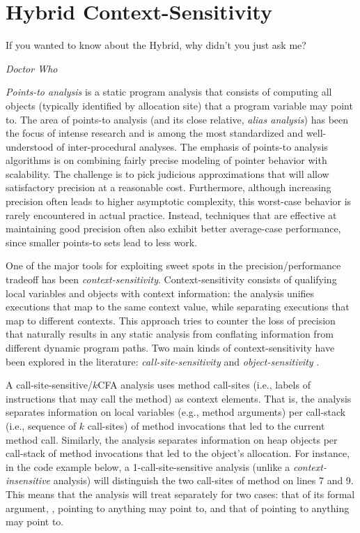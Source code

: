 \chapter{Hybrid Context-Sensitivity}\label{chapter:hybrid}

\epigraph{If you wanted to know about the Hybrid, why didn’t you just ask me?}{\textit{Doctor Who}}

\emph{Points-to analysis} is a static program analysis that consists
of computing all objects (typically identified by allocation site)
that a program variable may point to. The area of points-to analysis
(and its close relative, \emph{alias analysis}) has been the focus of
intense research and is among the most standardized and
well-understood of inter-procedural analyses. The emphasis of
points-to analysis algorithms is on combining fairly precise modeling
of pointer behavior with scalability. The challenge is to pick
judicious approximations that will allow satisfactory precision at a
reasonable cost. Furthermore, although increasing precision often
leads to higher asymptotic complexity, this worst-case behavior is
rarely encountered in actual practice. Instead, techniques that are
effective at maintaining good precision often also exhibit better
average-case performance, since smaller points-to sets lead to less
work.

One of the major tools for exploiting sweet spots in the
precision/performance tradeoff has been \emph{context-sensitivity}.
Context-sensitivity consists of qualifying local variables and objects
with context information: the analysis unifies executions that map to
the same context value, while separating executions that map to
different contexts. This approach tries to counter the loss of
precision that naturally results in any static analysis from
conflating information from different dynamic program paths. Two main
kinds of context-sensitivity have been explored in the literature:
\emph{call-site-sensitivity}
\cite{col:1981:Sharir,thesis:Shivers} and
\emph{object-sensitivity}
\cite{issta:2002:Milanova,article:2005:Milanova,popl:2011:Smaragdakis}.

A call-site-sensitive/$k$CFA analysis uses method call-sites (i.e.,
labels of instructions that may call the method) as context elements.
That is, the analysis separates information on local variables (e.g.,
method arguments) per call-stack (i.e., sequence of $k$ call-sites) of
method invocations that led to the current method call. Similarly, the
analysis separates information on heap objects per call-stack of
method invocations that led to the object's allocation. For instance,
in the code example below, a 1-call-site-sensitive analysis (unlike a
\emph{context-insensitive} analysis) will distinguish the two
call-sites of method  on lines 7 and 9. This means that the
analysis will treat  separately for two cases: that of its
formal argument, , pointing to anything  may point to, and
that of  pointing to anything  may point to.

